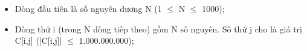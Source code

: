 \begin{itemize}
	\item     Dòng đầu tiên là số nguyên dương N (1  $\le$  N  $\le$  1000);   
	\item     Dòng thứ i (trong N dòng tiếp theo) gồm N số nguyên. Số thứ j cho là giá trị C[i,j] (|C[i,j]|  $\le$  1.000.000.000);   
\end{itemize}